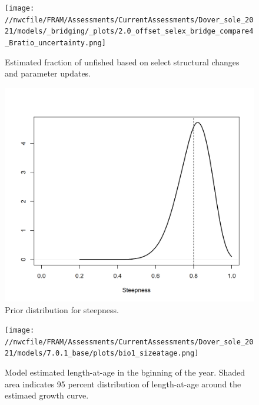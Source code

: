 \documentclass[11pt,
  english,
  a4paper,
]{article}
\begin{document}
\tagmcend\tagstructend


\begin{figure}
\centering
\texttt{[image: //nwcfile/FRAM/Assessments/CurrentAssessments/Dover\_sole\_2021/models/\_bridging/\_plots/2.0\_offset\_selex\_bridge\_compare4\_Bratio\_uncertainty.png]}
\caption{Estimated fraction of unfished based on select structural changes and parameter updates.\label{fig:structure-bridge-depl}}
\end{figure}

\tagmcend\tagstructend


\begin{figure}
\centering
\includegraphics[width=1\textwidth,height=1\textheight]{figs/h_prior.png}
\caption{Prior distribution for steepness.\label{fig:h-prior}}
\end{figure}

\tagmcend\tagstructend


\begin{figure}
\centering
\texttt{[image: //nwcfile/FRAM/Assessments/CurrentAssessments/Dover\_sole\_2021/models/7.0.1\_base/plots/bio1\_sizeatage.png]}
\caption{Model estimated length-at-age in the bginning of the year. Shaded area indicates 95 percent distribution of length-at-age around the estimaed growth curve.\label{fig:mod-est-len-age}}
\end{figure}
\end{document}
